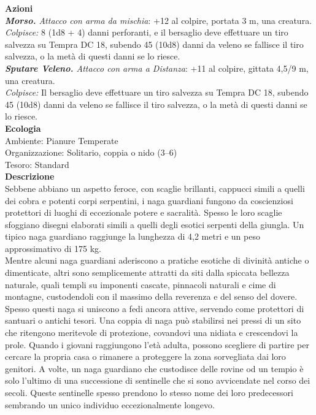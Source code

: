 \begin{multicols}{2}
\smallskip\textbf{Azioni}\\
\emph{\textbf{Morso.} Attacco con arma da mischia}: +12 al colpire, portata 3 m, una creatura.\\
\emph{Colpisce:} 8 (1d8 + 4) danni perforanti, e il bersaglio deve effettuare un tiro salvezza su Tempra DC  18, subendo 45 (10d8) danni da veleno se fallisce il tiro salvezza, o la metà di questi danni se lo riesce.\\
\emph{\textbf{Sputare Veleno.} Attacco con arma a Distanza}: +11 al colpire, gittata 4,5/9 m, una creatura.\\

\emph{Colpisce:} Il bersaglio deve effettuare un tiro salvezza su Tempra DC  18, subendo 45 (10d8) danni da veleno se fallisce il tiro salvezza, o la metà di questi danni se lo riesce.\\
\textbf{Ecologia}\\
Ambiente: Pianure Temperate\\
Organizzazione: Solitario, coppia o nido (3–6)\\
Tesoro: Standard\\
\textbf{Descrizione}\\
Sebbene abbiano un aspetto feroce, con scaglie brillanti, cappucci simili a quelli dei cobra e potenti corpi serpentini, i naga guardiani fungono da coscienziosi protettori di luoghi di eccezionale potere e sacralità. Spesso le loro scaglie sfoggiano disegni elaborati simili a quelli degli esotici serpenti della giungla. Un tipico naga guardiano raggiunge la lunghezza di 4,2 metri e un peso approssimativo di 175 kg.\\
Mentre alcuni naga guardiani aderiscono a pratiche esotiche di divinità antiche o dimenticate, altri sono semplicemente attratti da siti dalla spiccata bellezza naturale, quali templi su imponenti cascate, pinnacoli naturali e cime di montagne, custodendoli con il massimo della reverenza e del senso del dovere. Spesso questi naga si uniscono a fedi ancora attive, servendo come protettori di santuari o antichi tesori. Una coppia di naga può stabilirsi nei pressi di un sito che ritengono meritevole di protezione, covandovi una nidiata e crescendovi la prole. Quando i giovani raggiungono l'età adulta, possono scegliere di partire per cercare la propria casa o rimanere a proteggere la zona sorvegliata dai loro genitori. A volte, un naga guardiano che custodisce delle rovine od un tempio è solo l'ultimo di una successione di sentinelle che si sono avvicendate nel corso dei secoli. Queste sentinelle spesso prendono lo stesso nome dei loro predecessori sembrando un unico individuo eccezionalmente longevo.\\


\end{multicols}
